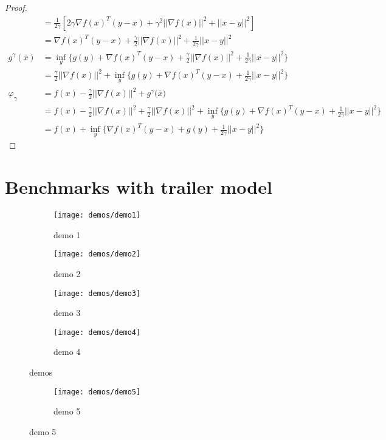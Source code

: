 \begin{proof}
\begin{align*}
	&= \frac{1}{2 \gamma}[ 2\gamma \nabla f(x)^T(y-x) + \gamma^2||\nabla f(x)||^2 + ||x-y||^2] \\
	&=  \nabla f(x)^T(y-x) +\frac{\gamma}{2}||\nabla f(x)||^2 + \frac{1}{2 \gamma} ||x-y||^2 \\
	g^{\gamma} (\bar{x})
	&=\underset{y}{\inf} \Big\{g(y)+ \nabla f(x)^T(y-x) +\frac{\gamma}{2}||\nabla f(x)||^2 + \frac{1}{2 \gamma} ||x-y||^2  \Big\} \\
	&= \frac{\gamma}{2}||\nabla f(x)||^2 + \underset{y}{\inf} \Big\{g(y)+ \nabla f(x)^T(y-x) + \frac{1}{2 \gamma} ||x-y||^2  \Big\} \\
	\varphi_{\gamma} 
	&= f(x) - \frac{\gamma}{2}||\nabla f(x)||^2 + g^{\gamma} \big(\bar{x} \big)\\
	&= f(x) - \frac{\gamma}{2}||\nabla f(x)||^2 +  \frac{\gamma}{2}||\nabla f(x)||^2 + \underset{y}{\inf} \Big\{g(y)+ \nabla f(x)^T(y-x) + \frac{1}{2 \gamma} ||x-y||^2  \Big\}\\
	&=   f(x) + \underset{y}{\inf} \Big\{ \nabla f(x)^T(y-x) + g(y) + \frac{1}{2 \gamma} ||x-y||^2  \Big\} 
	\end{align*}
	\label{prf:FBE alterative expression}
\end{proof}

\chapter{Benchmarks with trailer model}
\begin{figure}[H]
	\centering
	\begin{subfigure}[b]{0.40\textwidth}
		\centering
		\texttt{[image: demos/demo1]}
		\caption{demo 1}
		\label{fig:demo 1}
	\end{subfigure}
	\hfill
	\begin{subfigure}[b]{0.40\textwidth}
		\centering
		\texttt{[image: demos/demo2]}
		\caption{demo 2}
		\label{fig:demo 2}
	\end{subfigure}
	\begin{subfigure}[b]{0.40\textwidth}
		\centering
		\texttt{[image: demos/demo3]}
		\caption{demo 3}
		\label{fig:demo 3}
	\end{subfigure}
	\hfill
	\begin{subfigure}[b]{0.40\textwidth}
		\centering
		\texttt{[image: demos/demo4]}
		\caption{demo 4}
		\label{fig:demo 4}
	\end{subfigure}
	\caption{demos}
	\label{fig:demos}
\end{figure}
\begin{figure}[H]
	\centering
	\begin{subfigure}[b]{0.45\textwidth}
		\centering
		\texttt{[image: demos/demo5]}
		\caption{demo 5}
		\label{fig:demo 5}
	\end{subfigure}
\end{figure}

